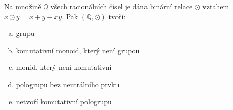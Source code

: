 Na množině $\mathbb{Q}$ všech racionálních čísel je dána binární relace $\odot$
vztahem $x \odot y = x + y - xy$. Pak $(\mathbb{Q}, \odot)$ tvoří:
\begin{enumerate}[(a)]
  \item grupu
  \item komutativní monoid, který není grupou
  \item monid, který není komutativní
  \item pologrupu bez neutrálního prvku
  \item netvoří komutativní pologrupu
\end{enumerate}
